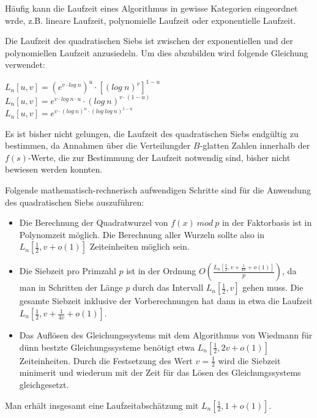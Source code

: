 \documentclass[a4paper,11pt]{article}
\begin{document}
Häufig kann die Laufzeit eines Algorithmus in gewisse Kategorien
eingeordnet wrde, z.B. lineare Laufzeit, polynomielle Laufzeit
oder exponentielle Laufzeit.

Die Laufzeit des quadratischen Siebs ist zwischen der exponentiellen
und der polynomiellen Laufzeit anzusiedeln. Um dies abzubilden
wird folgende Gleichung verwendet:
\begin{center}
$L_n[u,v] = (e^{v\cdot log\ n})^u\cdot[(log\ n)^v]^{1-u}$\\
$L_n[u,v] = e^{v\cdot log\ n\cdot u}\cdot(log\ n)^{v\cdot(1-u)}$\\
$L_n[u,v] = e^{v\cdot(log\ n)^u\cdot(log\ log\ n)^{1-u}}$
\end{center}
Es ist bisher nicht gelungen, die Laufzeit des quadratischen
Siebs endgültig zu bestimmen, da Annahmen über die
Verteilungder $B$-glatten Zahlen innerhalb der $f(s)$-Werte,
die zur Bestimmung der Laufzeit notwendig sind, bisher nicht
bewiesen werden konnten.

Folgende mathematisch-rechnerisch aufwendigen Schritte sind für
die Anwendung des quadratischen Siebs auszuführen:
\begin{itemize}

\item Die Berechnung der Quadratwurzel von $f(x)\ mod\ p$ in der
Faktorbasis ist in Polynomzeit möglich. Die
Berechnung aller Wurzeln sollte also in $L_n[\frac{1}{2},v+o(1)]$
Zeiteinheiten möglich sein.

\item Die Siebzeit pro Primzahl $p$ ist in der Ordnung
$O(\frac{L_n[\frac{1}{2}, v+\frac{1}{4v}+o(1)]}{p})$, da
man in Schritten der Länge $p$ durch das Intervall $L_n[\frac{1}{2},v]$
gehen muss. Die gesamte Siebzeit inklusive der Vorberechnungen hat
dann in etwa die Laufzeit $L_n[\frac{1}{2}, v+\frac{1}{4v}+o(1)]$.

\item Das Auflösen des Gleichungssystems mit dem Algorithmus von Wiedmann
für dünn bestzte Gleichungssysteme benötigt etwa $L_n[\frac{1}{2}, 2v+o(1)]$
Zeiteinheiten. Durch die Festsetzung des Wert $v = \frac{1}{2}$ wird die
Siebzeit minimerit und wiederum mit der Zeit für das Lösen des Gleichungssystems
gleichgesetzt.
\end{itemize}

Man erhält insgesamt eine Laufzeitabschätzung mit $L_n[\frac{1}{2}, 1+ o(1)]$.
\end{document}
